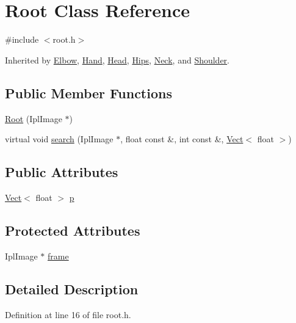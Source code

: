 \hypertarget{class_root}{\section{Root Class Reference}
\label{class_root}
}


{\ttfamily \#include $<$root.\+h$>$}



Inherited by \hyperlink{class_elbow}{Elbow}, \hyperlink{class_hand}{Hand}, \hyperlink{class_head}{Head}, \hyperlink{class_hips}{Hips}, \hyperlink{class_neck}{Neck}, and \hyperlink{class_shoulder}{Shoulder}.

\subsection*{Public Member Functions}
\begin{DoxyCompactItemize}
\item 
\hyperlink{class_root_a5a840fba35ef88eacf1acad5596e8724}{Root} (Ipl\+Image $\ast$)
\item 
virtual void \hyperlink{class_root_a536b4ace93b3d9dfdc50d8d8851a4554}{search} (Ipl\+Image $\ast$, float const \&, int const \&, \hyperlink{class_vect}{Vect}$<$ float $>$)
\end{DoxyCompactItemize}
\subsection*{Public Attributes}
\begin{DoxyCompactItemize}
\item 
\hyperlink{class_vect}{Vect}$<$ float $>$ \hyperlink{class_root_ab5aafe8e23d36ecce6e94c6ea798335b}{p}
\end{DoxyCompactItemize}
\subsection*{Protected Attributes}
\begin{DoxyCompactItemize}
\item 
Ipl\+Image $\ast$ \hyperlink{class_root_aa620e91f0af7edc315ce4c8e6981a2a2}{frame}
\end{DoxyCompactItemize}


\subsection{Detailed Description}


Definition at line 16 of file root.\+h.



